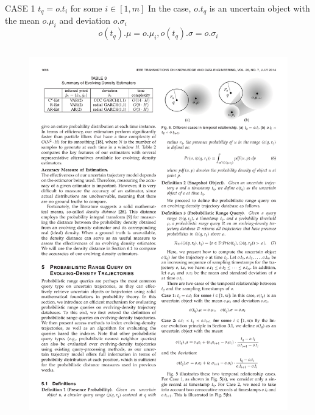 \begin{frame}
\begin{columns}
  \begin{block}{CASE 1 \quad $t_q = o.t_i$ for some $i \in [1, m]$}
    In the case, $o.t_q$ is an uncertain object with the mean $o.\mu_i$ and deviation $o.\sigma_i$
    \begin{equation*}
      o(t_q).\mu = o.\mu_i, o(t_q).\sigma = o.\sigma_i
    \end{equation*}
  \end{block}

\end{columns}

\vspace{-5pt}

\begin{columns}

  \begin{figure}[tb]
    \includegraphics[width=\columnwidth]{figures/5-1/5-1-5.pdf}
  \end{figure}


\end{columns}
\end{frame}
